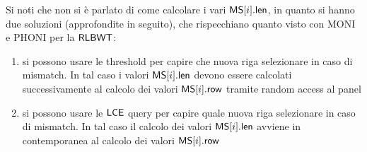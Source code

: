 Si noti che non si è parlato di come calcolare i vari $\mbox{\rm {\sf MS}}[i].\mbox{\rm {\sf len}}$, in
quanto si hanno due soluzioni (approfondite in seguito), che
rispecchiano quanto visto con 
MONI \cite{moni} e PHONI \cite{phoni} per la $\mbox{\rm {\sf RLBWT}}$: 
\begin{enumerate}
  \item si possono usare le threshold per capire che nuova riga
  selezionare in 
  caso di mismatch. In tal caso i valori $\mbox{\rm {\sf MS}}[i].\mbox{\rm {\sf len}}$ devono essere calcolati
  successivamente al calcolo dei valori $\mbox{\rm {\sf MS}}[i].\mbox{\rm {\sf row}}$ tramite random
    access al panel 
  \item si possono usare le $\mbox{\rm {\sf LCE}}$ query per capire quale nuova riga
  selezionare in caso di mismatch. In tal caso il calcolo dei valori
  $\mbox{\rm {\sf MS}}[i].\mbox{\rm {\sf len}}$ avviene in contemporanea al calcolo dei valori $\mbox{\rm {\sf MS}}[i].\mbox{\rm {\sf row}}$
\end{enumerate}
